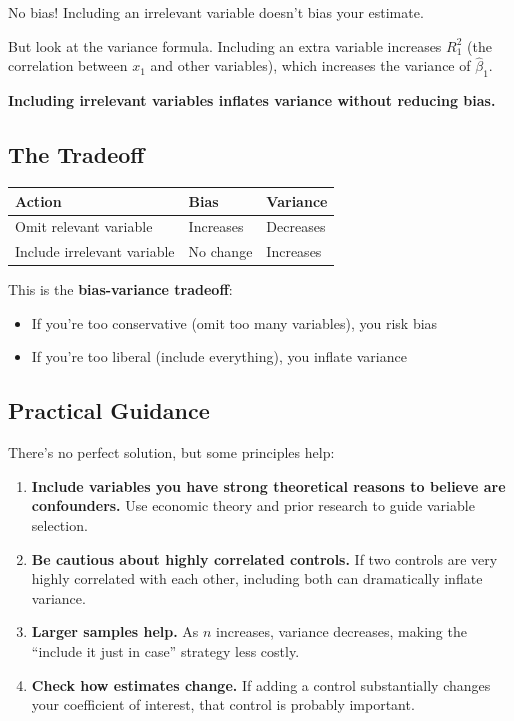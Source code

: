 \documentclass[
  letterpaper,
  DIV=11,
  numbers=noendperiod]{scrreprt}
\newcounter{none} %
\providecommand{\tightlist}{%
  \setlength{\itemsep}{0pt}\setlength{\parskip}{0pt}}
\begin{document}
No bias! Including an irrelevant variable doesn't bias your estimate.

But look at the variance formula. Including an extra variable increases
\(R_1^2\) (the correlation between \(x_1\) and other variables), which
increases the variance of \(\hat{\beta}_1\).

\textbf{Including irrelevant variables inflates variance without
reducing bias.}

\subsection{The Tradeoff}\label{the-tradeoff}

{\def\LTcaptype{none} %
\begin{longtable}[]{@{}lll@{}}
\toprule\noalign{}
Action & Bias & Variance \\
\midrule\noalign{}
\endhead
\bottomrule\noalign{}
\endlastfoot
Omit relevant variable & Increases & Decreases \\
Include irrelevant variable & No change & Increases \\
\end{longtable}
}

This is the \textbf{bias-variance tradeoff}:

\begin{itemize}
\tightlist
\item
  If you're too conservative (omit too many variables), you risk bias
\item
  If you're too liberal (include everything), you inflate variance
\end{itemize}

\subsection{Practical Guidance}\label{practical-guidance}

There's no perfect solution, but some principles help:

\begin{enumerate}
\def\labelenumi{\arabic{enumi}.}
\item
  \textbf{Include variables you have strong theoretical reasons to
  believe are confounders.} Use economic theory and prior research to
  guide variable selection.
\item
  \textbf{Be cautious about highly correlated controls.} If two controls
  are very highly correlated with each other, including both can
  dramatically inflate variance.
\item
  \textbf{Larger samples help.} As \(n\) increases, variance decreases,
  making the ``include it just in case'' strategy less costly.
\item
  \textbf{Check how estimates change.} If adding a control substantially
  changes your coefficient of interest, that control is probably
  important.
\end{enumerate}
\end{document}
